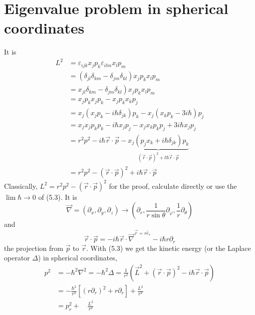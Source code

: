 \section{Eigenvalue problem in spherical coordinates}
It is
\begin{equation}
\begin{aligned} L^{2} &=\varepsilon_{i j k} x_{j} p_{k} \varepsilon_{i l m} x_{l} p_{m} \\ &=\left(\delta_{j l} \delta_{k m}-\delta_{j m} \delta_{k l}\right) x_{j} p_{k} x_{l} p_{m} \\ &\left.=x_{j l} \delta_{k m}-\delta_{j m} \delta_{k l}\right) x_{j} p_{k} x_{l} p_{m} \\ &=x_{j} p_{k} x_{j} p_{k}-x_{j} p_{k} x_{k} p_{j} \\ &=x_{j}\left(x_{j} p_{k}-i \hbar \delta_{j k}\right) p_{k}-x_{j}\left(x_{k} p_{k}-3 i \hbar\right) p_{j} \\ &=x_{j} x_{j} p_{k} p_{k}-i \hbar x_{j} p_{j}-x_{j} x_{k} p_{k} p_{j}+3 i \hbar x_{j} p_{j} \\ &=r^{2} p^{2}-i \hbar \vec{r} \cdot \vec{p}-\underbrace{x_{j}\left(p_{j} x_{k}+i \hbar \delta_{j k}\right) p_{k}}_{(\vec{r} \cdot \vec{p})^{2}+t \hbar \vec{r} \cdot \vec{p}} \\ &=r^{2} p^{2}-(\vec{r} \cdot \vec{p})^{2}+i \hbar \vec{r} \cdot \vec{p} \end{aligned}
\end{equation}
Classically, $L^2=r^2p^2-(\vec{r}\cdot\vec{p})^2$ for the proof, calculate directly or use the $\operatorname{lim}\hbar\rightarrow 0$ of (5.3). It is
$$
\vec{\nabla}=\left(\partial_{x}, \partial_{y}, \partial_{z}\right) \rightarrow\left(\partial_{r}, \frac{1}{r \sin \theta} \partial_{\varphi}, \frac{1}{r} \partial_{\theta}\right)
$$
and
\begin{equation}
    \vec{r} \cdot \vec{p}=-i \hbar \vec{r} \cdot \vec{\nabla}^{\vec{r}=r \hat{e}_{r}}-i \hbar r \partial_{r}
    \end{equation}
the projection from $\vec{p}$ to $\vec{r}$. With (5.3) we get the kinetic energy (or the Laplace operator $\Delta$) in spherical coordinates,
\begin{equation}
\begin{aligned} p^{2} &=-\hbar^{2} \nabla^{2}=-\hbar^{2} \Delta=\frac{1}{r^{2}}\left(\vec{L}^{2}+(\vec{r} \cdot \vec{p})^{2}-i \hbar \vec{r} \cdot \vec{p}\right) \\ &=-\frac{\hbar^{2}}{r^{2}}\left[\left(r \partial_{r}\right)^{2}+r \partial_{r}\right]+\frac{L^{2}}{r^{2}} \\ &=p_{r}^{2}+\quad \frac{L^{2}}{r^{2}} \end{aligned}
\end{equation}
